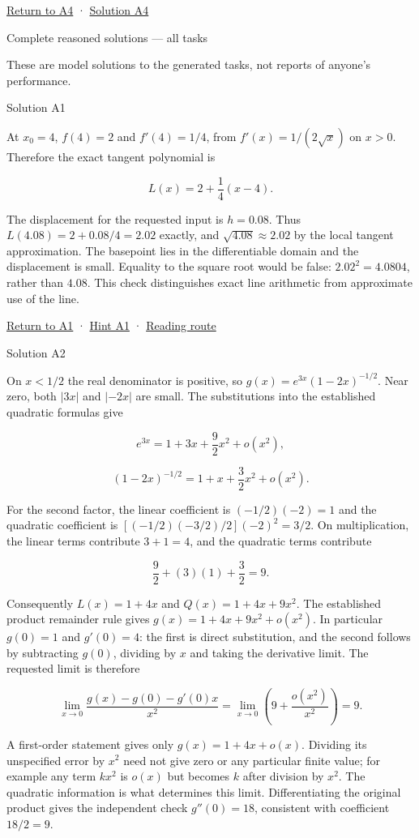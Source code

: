\documentclass[
  11pt,
]{article}
\providecommand{\gt}{>}
\providecommand{\lt}{<}
\begin{document}
\protect\hyperlink{a4}{Return to A4} · \protect\hyperlink{s4}{Solution
A4}

Complete reasoned solutions --- all tasks

These are model solutions to the generated tasks, not reports of
anyone's performance.

Solution A1

At \(x_0=4\), \(f(4)=2\) and \(f'(4)=1/4\), from \(f'(x)=1/(2\sqrt{x})\)
on \(x\gt 0\). Therefore the exact tangent polynomial is

\[L(x)=2+\frac14(x-4).\]

The displacement for the requested input is \(h=0.08\). Thus
\(L(4.08)=2+0.08/4=2.02\) exactly, and \(\sqrt{4.08}\approx2.02\) by the
local tangent approximation. The basepoint lies in the differentiable
domain and the displacement is small. Equality to the square root would
be false: \(2.02^2=4.0804\), rather than \(4.08\). This check
distinguishes exact line arithmetic from approximate use of the line.

\protect\hyperlink{a1}{Return to A1} · \protect\hyperlink{h1}{Hint A1} ·
\protect\hyperlink{route}{Reading route}

Solution A2

On \(x\lt 1/2\) the real denominator is positive, so
\(g(x)=e^{3x}(1-2x)^{-1/2}\). Near zero, both \(|3x|\) and \(|-2x|\) are
small. The substitutions into the established quadratic formulas give

\[e^{3x}=1+3x+\frac92x^2+o(x^2),\]

\[(1-2x)^{-1/2}=1+x+\frac32x^2+o(x^2).\]

For the second factor, the linear coefficient is \((-1/2)(-2)=1\) and
the quadratic coefficient is \([(-1/2)(-3/2)/2](-2)^2=3/2\). On
multiplication, the linear terms contribute \(3+1=4\), and the quadratic
terms contribute

\[\frac92+(3)(1)+\frac32=9.\]

Consequently \(L(x)=1+4x\) and \(Q(x)=1+4x+9x^2\). The established
product remainder rule gives \(g(x)=1+4x+9x^2+o(x^2)\). In particular
\(g(0)=1\) and \(g'(0)=4\): the first is direct substitution, and the
second follows by subtracting \(g(0)\), dividing by \(x\) and taking the
derivative limit. The requested limit is therefore

\[\lim_{x\to0}\frac{g(x)-g(0)-g'(0)x}{x^2}
=\lim_{x\to0}\left(9+\frac{o(x^2)}{x^2}\right)=9.\]

A first-order statement gives only \(g(x)=1+4x+o(x)\). Dividing its
unspecified error by \(x^2\) need not give zero or any particular finite
value; for example any term \(kx^2\) is \(o(x)\) but becomes \(k\) after
division by \(x^2\). The quadratic information is what determines this
limit. Differentiating the original product gives the independent check
\(g''(0)=18\), consistent with coefficient \(18/2=9\).
\end{document}
